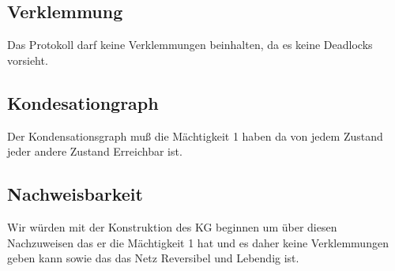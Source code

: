 \documentclass[10pt]{scrartcl}
\begin{document}
				\subsection{Verklemmung}
				Das Protokoll darf keine Verklemmungen beinhalten, da es keine Deadlocks vorsieht.
				
				\subsection{Kondesationgraph}
				Der Kondensationsgraph muß die Mächtigkeit 1 haben da von jedem Zustand jeder andere Zustand Erreichbar ist.
				
				\subsection{Nachweisbarkeit}
				Wir würden mit der Konstruktion des KG beginnen um über diesen Nachzuweisen das er die Mächtigkeit 1 hat und es daher keine Verklemmungen geben kann sowie das das Netz Reversibel und Lebendig ist.
								
				
\end{document}
